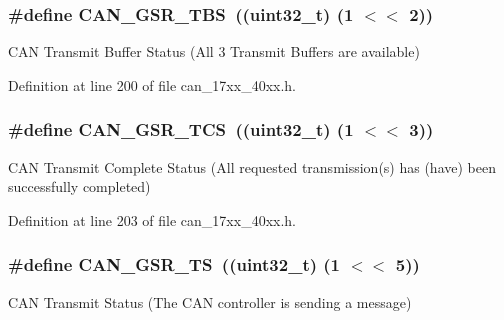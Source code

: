 \subsubsection[{\texorpdfstring{C\+A\+N\+\_\+\+G\+S\+R\+\_\+\+T\+BS}{CAN_GSR_TBS}}]{\setlength{\rightskip}{0pt plus 5cm}\#define C\+A\+N\+\_\+\+G\+S\+R\+\_\+\+T\+BS~((uint32\+\_\+t) (1 $<$$<$ 2))}\hypertarget{group__CAN__17XX__40XX_ga06334090a05005aac523bb3f7273de6f}{}\label{group__CAN__17XX__40XX_ga06334090a05005aac523bb3f7273de6f}
C\+AN Transmit Buffer Status (All 3 Transmit Buffers are available) 

Definition at line 200 of file can\+\_\+17xx\+\_\+40xx.\+h.

\subsubsection[{\texorpdfstring{C\+A\+N\+\_\+\+G\+S\+R\+\_\+\+T\+CS}{CAN_GSR_TCS}}]{\setlength{\rightskip}{0pt plus 5cm}\#define C\+A\+N\+\_\+\+G\+S\+R\+\_\+\+T\+CS~((uint32\+\_\+t) (1 $<$$<$ 3))}\hypertarget{group__CAN__17XX__40XX_gac8f1a706b4a31638bf92c8cfa6b191a2}{}\label{group__CAN__17XX__40XX_gac8f1a706b4a31638bf92c8cfa6b191a2}
C\+AN Transmit Complete Status (All requested transmission(s) has (have) been successfully completed) 

Definition at line 203 of file can\+\_\+17xx\+\_\+40xx.\+h.

\subsubsection[{\texorpdfstring{C\+A\+N\+\_\+\+G\+S\+R\+\_\+\+TS}{CAN_GSR_TS}}]{\setlength{\rightskip}{0pt plus 5cm}\#define C\+A\+N\+\_\+\+G\+S\+R\+\_\+\+TS~((uint32\+\_\+t) (1 $<$$<$ 5))}\hypertarget{group__CAN__17XX__40XX_ga204f003cdb1c178fa4822fd690bd75b8}{}\label{group__CAN__17XX__40XX_ga204f003cdb1c178fa4822fd690bd75b8}
C\+AN Transmit Status (The C\+AN controller is sending a message) 

